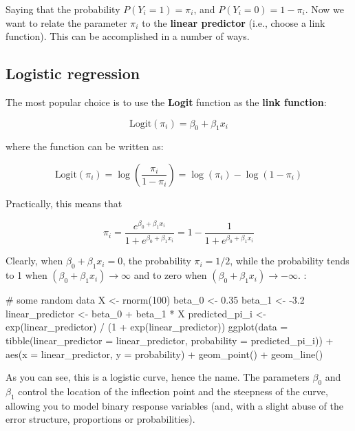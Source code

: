 \documentclass[
  letterpaper,
  DIV=11,
  numbers=noendperiod]{scrreprt}
\newenvironment{Shaded}{\begin{snugshade}}{\end{snugshade}}
\newcommand{\NormalTok}[1]{\textcolor[rgb]{0.00,0.23,0.31}{#1}}
\begin{document}
Saying that the probability \(P(Y_i = 1) = \pi_i\), and
\(P(Y_i = 0) = 1 - \pi_i\). Now we want to relate the parameter
\(\pi_i\) to the \textbf{linear predictor} (i.e., choose a link
function). This can be accomplished in a number of ways.

\subsection{Logistic regression}\label{logistic-regression}

The most popular choice is to use the \textbf{Logit} function as the
\textbf{link function}:

\[
\text{Logit}(\pi_i) = \beta_0 + \beta_1 x_i 
\]

where the function can be written as:

\[
\text{Logit}(\pi_i) = \log\left( \frac{\pi_i}{1 - \pi_i} \right) = \log(\pi_i) - \log(1 - \pi_i)
\]

Practically, this means that

\[
\pi_i = \frac{e^{\beta_0 + \beta_1 x_i}}{1 + e^{\beta_0 + \beta_1 x_i}} = 1 - \frac{1}{1 + e^{\beta_0 + \beta_1 x_i}}
\]

Clearly, when \(\beta_0 + \beta_1 x_i = 0\), the probability
\(\pi_i = 1/2\), while the probability tends to 1 when
\((\beta_0 + \beta_1 x_i) \to \infty\) and to zero when
\((\beta_0 + \beta_1 x_i) \to -\infty\). :

\begin{Shaded}
\begin{Highlighting}[]
\NormalTok{\# some random data}
\NormalTok{X \textless{}{-} rnorm(100)}
\NormalTok{beta\_0 \textless{}{-} 0.35}
\NormalTok{beta\_1 \textless{}{-} {-}3.2}
\NormalTok{linear\_predictor \textless{}{-} beta\_0 + beta\_1 * X}
\NormalTok{predicted\_pi\_i \textless{}{-} exp(linear\_predictor) / (1 + exp(linear\_predictor))}
\NormalTok{ggplot(data = tibble(linear\_predictor = linear\_predictor, probability = predicted\_pi\_i)) + }
\NormalTok{  aes(x = linear\_predictor, y = probability) + }
\NormalTok{  geom\_point() + geom\_line()}
\end{Highlighting}
\end{Shaded}

As you can see, this is a logistic curve, hence the name. The parameters
\(\beta_0\) and \(\beta_1\) control the location of the inflection point
and the steepness of the curve, allowing you to model binary response
variables (and, with a slight abuse of the error structure, proportions
or probabilities).
\end{document}
